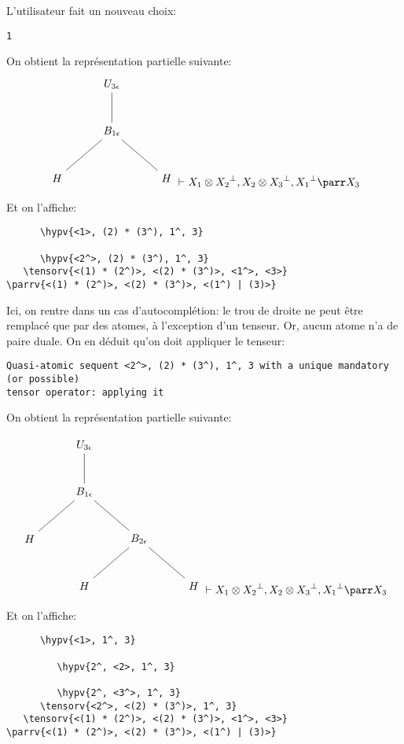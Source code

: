 \documentclass[11pt,a4paper]{article}
\theoremstyle{plain}
\theoremstyle{definition}
\theoremstyle{remark}
\newcommand*{\orth}{^\perp}
\newcommand*{\tensor}{\otimes}
\newcommand*{\hypv}[1]{\hypo{\vdash #1}}
\newcommand*{\tensorv}[1]{\infer{2}[\ensuremath{\tensor}]{\vdash #1}}
\newcommand*{\parrv}[1]{\infer{1}[\ensuremath{\parr}]{\vdash #1}}
\newcommand*{\unknown}{H}
\begin{document}
L'utilisateur fait un nouveau choix:
\begin{verbatim}
1
\end{verbatim}

On obtient la représentation partielle suivante:
\begin{equation*}
    \begin{tikzpicture}%
        [level 2/.style={sibling distance=3.5cm}]
        \node {$U_{3 \epsilon}$}
        child {node {$B_{1 \epsilon}$}
            child {node {$\unknown$}}
            child {node {$\unknown$}}
        };
    \end{tikzpicture} \vdash X_1 \tensor {X_2}\orth, X_2 \tensor {X_3}\orth, {X_1}\orth \parr X_3
\end{equation*}

Et on l'affiche:

\begin{verbatim}
      \hypv{<1>, (2) * (3^), 1^, 3}

      \hypv{<2^>, (2) * (3^), 1^, 3}
   \tensorv{<(1) * (2^)>, <(2) * (3^)>, <1^>, <3>}
\parrv{<(1) * (2^)>, <(2) * (3^)>, <(1^) | (3)>}
\end{verbatim}

Ici, on rentre dans un cas d'autocomplétion: le trou de droite ne peut être remplacé que par des atomes, à l'exception d'un tenseur. Or, aucun atome n'a de paire duale. On en déduit qu'on doit appliquer le tenseur:

\begin{verbatim}
Quasi-atomic sequent <2^>, (2) * (3^), 1^, 3 with a unique mandatory (or possible)
tensor operator: applying it
\end{verbatim}

On obtient la représentation partielle suivante:

\begin{equation*}
    \begin{tikzpicture}%
        [level 2/.style={sibling distance=3.5cm}]
        \node {$U_{3 \epsilon}$}
        child {node {$B_{1 \epsilon}$}
            child {node {$\unknown$}}
            child {node {$B_{2 \epsilon}$}
                child{node {$\unknown$}}
                child{node {$\unknown$}}}
        };
    \end{tikzpicture} \vdash X_1 \tensor {X_2}\orth, X_2 \tensor {X_3}\orth, {X_1}\orth \parr X_3
\end{equation*}

Et on l'affiche:

\begin{verbatim}
      \hypv{<1>, 1^, 3}

         \hypv{2^, <2>, 1^, 3}

         \hypv{2^, <3^>, 1^, 3}
      \tensorv{<2^>, <(2) * (3^)>, 1^, 3}
   \tensorv{<(1) * (2^)>, <(2) * (3^)>, <1^>, <3>}
\parrv{<(1) * (2^)>, <(2) * (3^)>, <(1^) | (3)>}
\end{verbatim}
\end{document}
